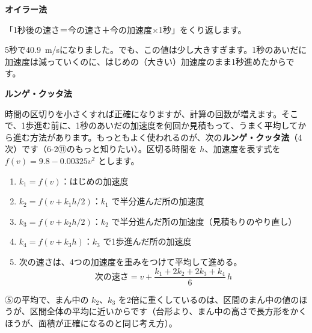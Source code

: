 \noindent\textbf{オイラー法}\par
\noindent 「1秒後の速さ＝今の速さ＋今の加速度×1秒」をくり返します。
\begin{bkcenter}
\end{bkcenter}
5秒で\qty{40.9}{m/s}になりました。でも、この値は少し大きすぎます。1秒のあいだに加速度は減っていくのに、はじめの（大きい）加速度のまま1秒進めたからです。

\noindent\textbf{ルンゲ・クッタ法}\par
\noindent 時間の区切りを小さくすれば正確になりますが、計算の回数が増えます。そこで、1歩進む前に、1秒のあいだの加速度を何回か見積もって、うまく平均してから進む方法があります。もっともよく使われるのが、次の\textbf{ルンゲ・クッタ法}（4次）です（\mbox{6-2⑪}のもっと知りたい）。区切る時間を $h$、加速度を表す式を $f(v)=9.8-0.00325v^2$ とします。
\begin{enumerate}[label={\bkcircled{\arabic*}}, leftmargin=2.4\zw, itemsep=1pt, topsep=2pt]
\item $k_1=f(v)$：はじめの加速度
\item $k_2=f(v+k_1h/2)$：$k_1$ で半分進んだ所の加速度
\item $k_3=f(v+k_2h/2)$：$k_2$ で半分進んだ所の加速度（見積もりのやり直し）
\item $k_4=f(v+k_3h)$：$k_3$ で1歩進んだ所の加速度
\item 次の速さは、4つの加速度を重みをつけて平均して進める。
\[ \text{次の速さ}=v+\frac{k_1+2k_2+2k_3+k_4}{6}\,h \]
\end{enumerate}
⑤の平均で、まん中の $k_2$、$k_3$ を2倍に重くしているのは、区間のまん中の値のほうが、区間全体の平均に近いからです（台形より、まん中の高さで長方形をかくほうが、面積が正確になるのと同じ考え方）。


